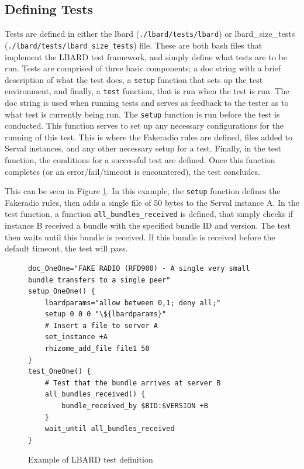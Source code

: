 \subsection{Defining Tests}
Tests are defined in either the lbard (\texttt{./lbard/tests/lbard}) or lbard\_size\_tests (\texttt{./lbard/tests/lbard\_size\_tests}) file. 
These are both bash files that implement the LBARD test framework, and simply define what tests are to be run.
Tests are comprised of three basic components; a doc string with a brief description of what the test does, a \texttt{setup} function that sets up the test environment, and finally, a \texttt{test} function, that is run when the test is run.
The doc string is used when running tests and serves as feedback to the tester as to what test is currently being run.
The \texttt{setup} function is run before the test is conducted. This function serves to set up any necessary configurations for the running of this test. This is where the Fakeradio rules are defined, files added to Serval instances, and any other necessary setup for a test.
Finally, in the test function, the conditions for a successful test are defined. Once this function completes (or an error/fail/timeout is encountered), the test concludes.


This can be seen in Figure \ref{fig:testDefinition}. 
In this example, the \texttt{setup} function defines the Fakeradio rules, then adds a single file of 50 bytes to the Serval instance A. 
In the test function, a function \texttt{all\_bundles\_received} is defined, that simply checks if instance B received a bundle with the specified bundle ID and version. 
The test then waits until this bundle is received. 
If this bundle is received before the default timeout, the test will pass.

\lstset{language=bash,
showstringspaces=false,
numbers=left,
}

\begin{figure}
    \begin{centering}

\begin{lstlisting}[breaklines, frame=single]
doc_OneOne="FAKE RADIO (RFD900) - A single very small bundle transfers to a single peer"
setup_OneOne() {
    lbardparams="allow between 0,1; deny all;"
    setup 0 0 0 "\${lbardparams}" 
    # Insert a file to server A
    set_instance +A
    rhizome_add_file file1 50
}
test_OneOne() {
    # Test that the bundle arrives at server B
    all_bundles_received() {
        bundle_received_by $BID:$VERSION +B 
    }
    wait_until all_bundles_received
} 
\end{lstlisting}
        \caption{Example of LBARD test definition}
        \label{fig:testDefinition}
    \end{centering}
\end{figure}

